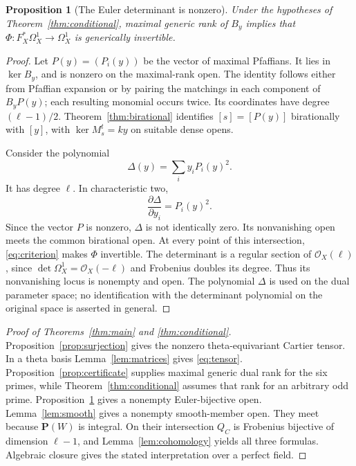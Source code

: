 \documentclass[11pt]{article}
\newtheorem{proposition}[theorem]{Proposition}
\theoremstyle{definition}\newtheorem{definition}[theorem]{Definition}
\theoremstyle{remark}\newtheorem{remark}[theorem]{Remark}
\newcommand{\OO}{\mathcal O}
\newcommand{\PP}{\mathbf P}
\begin{document}
\begin{proposition}[The Euler determinant is nonzero]\label{prop:generic}
Under the hypotheses of Theorem~\ref{thm:conditional}, maximal generic rank of $B_y$ implies that $\Phi:F_X^*\Omega_X^1\to\Omega_X^1$ is generically invertible.
\end{proposition}
\begin{proof}
Let $P(y)=(P_i(y))$ be the vector of maximal Pfaffians. It lies in $\ker B_y$, and is nonzero on the maximal-rank open. The identity follows either from Pfaffian expansion or by pairing the matchings in each component of $B_yP(y)$; each resulting monomial occurs twice. Its coordinates have degree $(\ell-1)/2$. Theorem~\ref{thm:birational} identifies $[s]=[P(y)]$ birationally with $[y]$, with $\ker M_s^t=ky$ on suitable dense opens.

Consider the polynomial
\[
 \Delta(y)=\sum_i y_iP_i(y)^2.
\]
It has degree $\ell$. In characteristic two,
\[
 \frac{\partial\Delta}{\partial y_i}=P_i(y)^2.
\]
Since the vector $P$ is nonzero, $\Delta$ is not identically zero. Its nonvanishing open meets the common birational open. At every point of this intersection, \eqref{eq:criterion} makes $\Phi$ invertible. The determinant is a regular section of $\OO_X(\ell)$, since $\det\Omega_X^1=\OO_X(-\ell)$ and Frobenius doubles its degree. Thus its nonvanishing locus is nonempty and open. The polynomial $\Delta$ is used on the dual parameter space; no identification with the determinant polynomial on the original space is asserted in general.
\end{proof}

\begin{proof}[Proof of Theorems~\ref{thm:main} and \ref{thm:conditional}]
Proposition~\ref{prop:surjection} gives the nonzero theta-equivariant Cartier tensor. In a theta basis Lemma~\ref{lem:matrices} gives \eqref{eq:tensor}. Proposition~\ref{prop:certificate} supplies maximal generic dual rank for the six primes, while Theorem~\ref{thm:conditional} assumes that rank for an arbitrary odd prime. Proposition~\ref{prop:generic} gives a nonempty Euler-bijective open. Lemma~\ref{lem:smooth} gives a nonempty smooth-member open. They meet because $\PP(W)$ is integral. On their intersection $Q_C$ is Frobenius bijective of dimension $\ell-1$, and Lemma~\ref{lem:cohomology} yields all three formulas. Algebraic closure gives the stated interpretation over a perfect field.
\end{proof}
\end{document}
